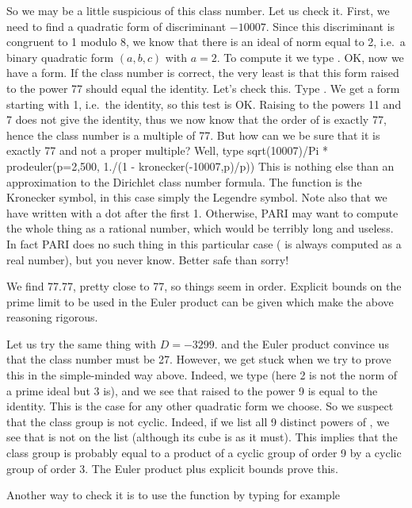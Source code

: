 So we may be a little suspicious of this class number. Let us check it.
First, we need to find a quadratic form of discriminant $-10007$. Since this
discriminant is congruent to 1 modulo 8, we know that there is an ideal of
norm equal to 2, i.e.~a binary quadratic form $(a,b,c)$ with $a=2$. To
compute it we type . OK, now we have a form.
If the class number is correct, the very least is that this form raised to
the power 77 should equal the identity. Let's check this. Type .
We get a form starting with 1, i.e.~the identity, so this test is OK. Raising
 to the powers 11 and 7 does not give the identity, thus we now know
that the order of  is exactly 77, hence the class number is a multiple
of 77. But how can we be sure that it is exactly 77 and not a proper multiple?
Well, type
%
\bprog
  sqrt(10007)/Pi * prodeuler(p=2,500, 1./(1 - kronecker(-10007,p)/p))
\eprog
%
This is nothing else than an approximation to the Dirichlet class number
formula. The function  is the Kronecker symbol, in this case
simply the Legendre symbol. Note also that we have written 
with a dot after the first 1. Otherwise, PARI may want to compute the whole
thing as a rational number, which would be terribly long and useless. In fact
PARI does no such thing in this particular case ( is always
computed as a real number), but you never know. Better safe than sorry!

We find 77.77, pretty close to 77, so things seem in order. Explicit bounds
on the prime limit to be used in the Euler product can be given which make
the above reasoning rigorous.

Let us try the same thing with $D=-3299$.  and the Euler
product convince us that the class number must be 27. However, we get stuck
when we try to prove this in the simple-minded way above. Indeed, we type
 (here 2 is not the norm of a prime ideal but
3 is), and we see that  raised to the power 9 is equal to the identity.
This is the case for any other quadratic form we choose. So we suspect that the
class group is not cyclic. Indeed, if we list all 9 distinct powers of ,
we see that  is not on the list (although its cube
is as it must). This implies that the class group is probably equal to a
product of a cyclic group of order 9 by a cyclic group of order 3. The Euler
product plus explicit bounds prove this.

Another way to check it is to use the  function by typing
for example

